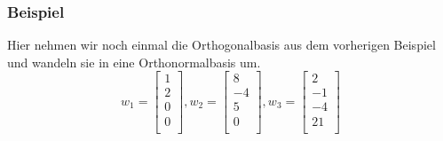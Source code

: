 \documentclass{report}
\begin{document}
			\subsubsection*{Beispiel}
				Hier nehmen wir noch einmal die Orthogonalbasis aus dem vorherigen Beispiel und wandeln sie in eine Orthonormalbasis um.
				\begin{equation*}
					w_1 = \begin{bmatrix} 1 \\ 2 \\ 0 \\ 0 \\ \end{bmatrix}, 
					w_2 = \begin{bmatrix} 8 \\ -4 \\ 5 \\ 0 \\ \end{bmatrix}, 
					w_3 = \begin{bmatrix} 2 \\ -1 \\ -4 \\ 21 \\ \end{bmatrix}
				\end{equation*}
\end{document}
